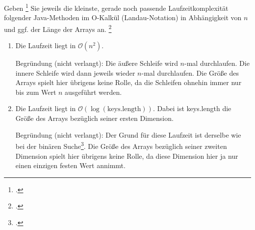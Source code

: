 \documentclass{bschlangaul-aufgabe}
\begin{document}

Geben
\footcite[Thema 2 Aufgabe 2 (Auszug)]{examen:46115:2016:09} Sie jeweils die kleinste, gerade noch passende Laufzeitkomplexität
folgender Java-Methoden im O-Kalkül (Landau-Notation) in Abhängigkeit
von $n$ und ggf. der Länge der Arrays an.
\footcite[entnommen aus Algorithmen und Datenstrukturen, Übungsblatt 3, Universität Würzburg, Aufgabe 5]{aud:pu:7}

\begin{enumerate}
\item \strut\bigskip


\begin{bAntwort}
Die Laufzeit liegt in $\mathcal{O}(n^2)$.

Begründung (nicht verlangt): Die äußere Schleife wird $n$-mal
durchlaufen. Die innere Schleife wird dann jeweils wieder $n$-mal
durchlaufen. Die Größe des Arrays spielt hier übrigens keine Rolle, da
die Schleifen ohnehin immer nur bis zum Wert $n$ ausgeführt werden.
\end{bAntwort}

\item \strut\bigskip


\begin{bAntwort}
Die Laufzeit liegt in $\mathcal{O}(\log(\text{keys.length}))$. Dabei ist
keys.length die Größe des Arrays bezüglich seiner ersten Dimension.

Begründung (nicht verlangt): Der Grund für diese Laufzeit ist derselbe
wie bei der binären Suche\footcite[Seite 122]{saake}. Die
Größe des Arrays bezüglich seiner zweiten Dimension spielt hier übrigens
keine Rolle, da diese Dimension hier ja nur einen einzigen festen Wert
annimmt.
\end{bAntwort}
\end{enumerate}
\end{document}
